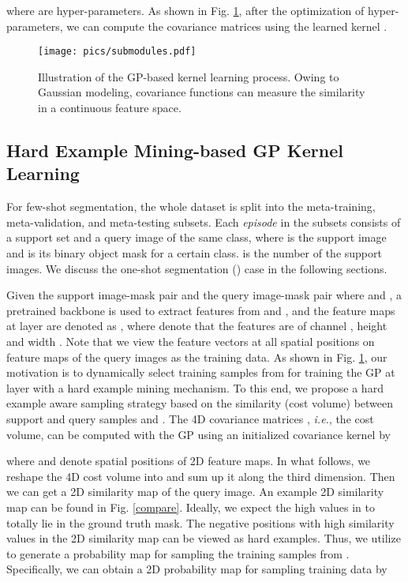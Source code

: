 \documentclass[runningheads]{llncs}
\begin{document}
where  are hyper-parameters. As shown in Fig. \ref{subgp}, after the optimization of hyper-parameters, we can compute the covariance matrices using the learned kernel .


\begin{figure}[t]
	\centering
	\texttt{[image: pics/submodules.pdf]}
	\caption{Illustration of the GP-based kernel learning process. Owing to Gaussian modeling, covariance functions can measure the similarity in a continuous feature space.}
	\label{subgp}
\end{figure} 

\subsection{Hard Example Mining-based GP Kernel Learning}
For few-shot segmentation, the whole dataset is split into the meta-training, meta-validation, and meta-testing subsets. Each \textit{episode} \cite{vinyals2016matching,shaban2017one} in the subsets consists of a support set  and a query image  of the same class, where  is the support image and  is its binary object mask for a certain class.  is the number of the support images. We discuss the one-shot segmentation () case in the following sections.

Given the support image-mask pair  and the query image-mask pair  where  and , a pretrained backbone is used to extract features from  and , and the feature maps at layer  are denoted as , where  denote that the features are of channel , height  and width . Note that we view the feature vectors at all spatial positions on feature maps of the query images as the training data. As shown in Fig. \ref{subgp}, our motivation is to dynamically select training samples from  for training the GP at layer  with a hard example mining mechanism. To this end, we propose a hard example aware sampling strategy based on the similarity (cost volume) between support and query samples  and . The 4D covariance matrices , \textit{i.e.}, the cost volume, can be computed with the GP using an initialized covariance kernel by

where  and  denote spatial positions of 2D feature maps. In what follows, we reshape the 4D cost volume into  and sum up it along the third dimension. Then we can get a 2D similarity map  of the query image. An example 2D similarity map can be found in Fig. \ref{compare}. Ideally, we expect the high values in  to totally lie in the ground truth mask. The negative positions with high similarity values in the 2D similarity map  can be viewed as hard examples. Thus, we utilize  to generate a probability map for sampling the training samples from . Specifically, we can obtain a 2D probability map for sampling training data by
\end{document}
